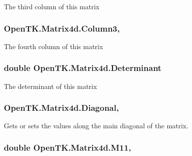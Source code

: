The third column of this matrix 

\hypertarget{struct_open_t_k_1_1_matrix4d_a83998c5b965ea046bb22725b94c39e2f}{
\subsubsection[{Column3}]{ Open\-T\-K.\-Matrix4d.\-Column3\hspace{0.3cm}{\ttfamily [get]}, {\ttfamily [set]}}}\label{struct_open_t_k_1_1_matrix4d_a83998c5b965ea046bb22725b94c39e2f}


The fourth column of this matrix 

\hypertarget{struct_open_t_k_1_1_matrix4d_adf0dd00b8e2c98dc1d710144d831baba}{
\subsubsection[{Determinant}]{\setlength{\rightskip}{0pt plus 5cm}double Open\-T\-K.\-Matrix4d.\-Determinant\hspace{0.3cm}{\ttfamily [get]}}}\label{struct_open_t_k_1_1_matrix4d_adf0dd00b8e2c98dc1d710144d831baba}


The determinant of this matrix 

\hypertarget{struct_open_t_k_1_1_matrix4d_a33e902458ac1b21fb62aac961b335999}{
\subsubsection[{Diagonal}]{ Open\-T\-K.\-Matrix4d.\-Diagonal\hspace{0.3cm}{\ttfamily [get]}, {\ttfamily [set]}}}\label{struct_open_t_k_1_1_matrix4d_a33e902458ac1b21fb62aac961b335999}


Gets or sets the values along the main diagonal of the matrix. 

\hypertarget{struct_open_t_k_1_1_matrix4d_ac128dd5c0aaa0eb15ce4b49149a2d5c2}{
\subsubsection[{M11}]{\setlength{\rightskip}{0pt plus 5cm}double Open\-T\-K.\-Matrix4d.\-M11\hspace{0.3cm}{\ttfamily [get]}, {\ttfamily [set]}}}\label{struct_open_t_k_1_1_matrix4d_ac128dd5c0aaa0eb15ce4b49149a2d5c2}


